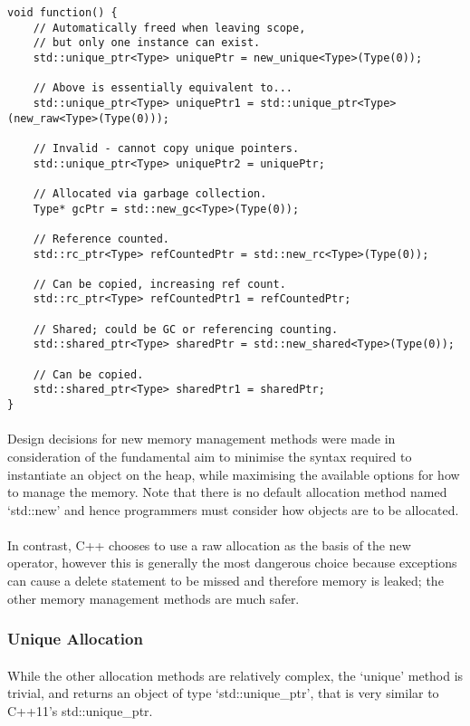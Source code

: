 \documentclass[12pt,twoside,notitlepage]{report}
\begin{document}
\begin{lstlisting}
void function() {
	// Automatically freed when leaving scope,
	// but only one instance can exist.
	std::unique_ptr<Type> uniquePtr = new_unique<Type>(Type(0));
	
	// Above is essentially equivalent to...
	std::unique_ptr<Type> uniquePtr1 = std::unique_ptr<Type>(new_raw<Type>(Type(0)));
	
	// Invalid - cannot copy unique pointers.
	std::unique_ptr<Type> uniquePtr2 = uniquePtr;
	
	// Allocated via garbage collection.
	Type* gcPtr = std::new_gc<Type>(Type(0));
	
	// Reference counted.
	std::rc_ptr<Type> refCountedPtr = std::new_rc<Type>(Type(0));
	
	// Can be copied, increasing ref count.
	std::rc_ptr<Type> refCountedPtr1 = refCountedPtr;
	
	// Shared; could be GC or referencing counting.
	std::shared_ptr<Type> sharedPtr = std::new_shared<Type>(Type(0));
	
	// Can be copied.
	std::shared_ptr<Type> sharedPtr1 = sharedPtr;
}
\end{lstlisting}


\paragraph{}
Design decisions for new memory management methods were made in consideration of the fundamental aim to minimise the syntax required to instantiate an object on the heap, while maximising the available options for how to manage the memory. Note that there is no default allocation method named `std::new' and hence programmers must consider how objects are to be allocated.

\paragraph{}
In contrast, C++ chooses to use a raw allocation as the basis of the new operator, however this is generally the most dangerous choice because exceptions can cause a delete statement to be missed and therefore memory is leaked; the other memory management methods are much safer.

\subsubsection{Unique Allocation}

\paragraph{}
While the other allocation methods are relatively complex, the `unique' method is trivial, and returns an object of type `std::unique\_ptr', that is very similar to C++11's std::unique\_ptr.
\end{document}
